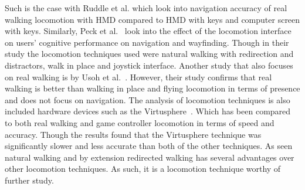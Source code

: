\noindent
Such is the case with Ruddle et al.\cite{ruddle2009benefits} which look into navigation accuracy of real walking locomotion with HMD compared to HMD with keys and computer screen with keys. Similarly, Peck et al.~\cite{peck2012design} look into the effect of the locomotion interface on users’ cognitive performance on navigation and wayfinding. Though in their study the locomotion techniques used were natural walking with redirection and distractors, walk in place and joystick interface. Another study that also focuses on real walking is by Usoh et al.~\cite{usoh1999walking}. However, their study confirms that real walking is better than walking in place and flying locomotion in terms of presence and does not focus on navigation. The analysis of locomotion techniques is also included hardware devices such as the Virtusphere~\cite{nabiyouni2015comparing}. Which has been compared to both real walking and game controller locomotion in terms of speed and accuracy. Though the results found that the Virtusphere technique was significantly slower and less accurate than both of the other techniques. As seen natural walking and by extension redirected walking has several advantages over other locomotion techniques. As such, it is a locomotion technique worthy of further study.
\bigskip


